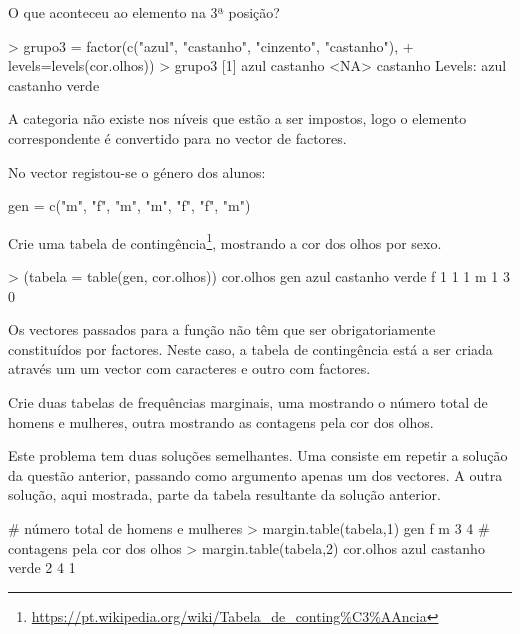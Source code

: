 \documentclass{exam}
\begin{document}
\begin{questions}
O que aconteceu ao elemento na 3ª posição?

\begin{solution}
	\begin{rcode}
		> grupo3 = factor(c("azul", "castanho", "cinzento", "castanho"),
		+ levels=levels(cor.olhos))
		> grupo3
		[1] azul     castanho <NA>     castanho
		Levels: azul castanho verde
	\end{rcode}
	A categoria  não existe nos níveis que estão a ser impostos, logo o elemento correspondente é convertido para  no vector de factores.
\end{solution}

\question No vector  registou-se o género dos alunos:
\begin{rcode}
	gen = c("m", "f", "m", "m", "f", "f", "m")
\end{rcode}

Crie uma tabela de contingência\footnote{\url{https://pt.wikipedia.org/wiki/Tabela_de_conting\%C3\%AAncia}}, mostrando a cor dos olhos por sexo.

\begin{solution}
	\begin{rcode}
		> (tabela = table(gen, cor.olhos))
		cor.olhos
		gen azul castanho verde
		f    1        1     1
		m    1        3     0
	\end{rcode}
	Os vectores passados para a função  não têm que ser obrigatoriamente constituídos por factores. Neste caso, a tabela de contingência está a ser criada através um um vector com caracteres e outro com factores.
\end{solution}

\question Crie duas tabelas de frequências marginais, uma mostrando o número total de homens e mulheres, outra mostrando as contagens pela cor dos olhos.

\begin{solution}
	Este problema tem duas soluções semelhantes. Uma consiste em repetir a solução da questão anterior, passando como argumento apenas um dos vectores. A outra solução, aqui mostrada, parte da tabela resultante da solução anterior.
	\begin{rcode}
		# número total de homens e mulheres
		> margin.table(tabela,1)
		gen
		f m 
		3 4 
		# contagens pela cor dos olhos
		> margin.table(tabela,2)
		cor.olhos
		azul castanho    verde 
		2        4        1 
	\end{rcode}
\end{solution}


\end{questions}
\end{document}
